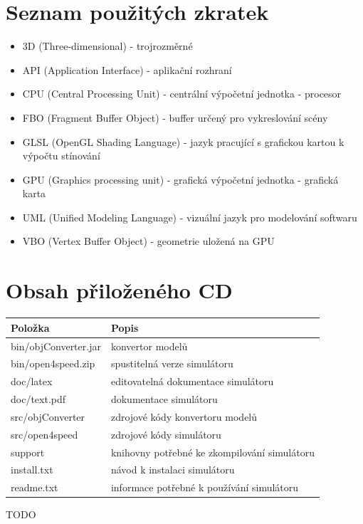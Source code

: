 \documentclass[11pt,twoside,a4paper]{book}
\begin{document}
%

\appendix

\chapter{Seznam použitých zkratek}
\begin{itemize}
\item 3D (Three-dimensional) - trojrozměrné
\item API (Application Interface) - aplikační rozhraní
\item CPU (Central Processing Unit) - centrální výpočetní jednotka - procesor
\item FBO (Fragment Buffer Object) - buffer určený pro vykreslování scény
\item GLSL (OpenGL Shading Language) - jazyk pracující s grafickou kartou k výpočtu stínování
\item GPU (Graphics processing unit) - grafická výpočetní jednotka - grafická karta
\item UML (Unified Modeling Language) - vizuální jazyk pro modelování softwaru
\item VBO (Vertex Buffer Object) - geometrie uložená na GPU
\end{itemize}

\chapter{Obsah přiloženého CD}

\begin{center}
\begin{tabular}{|p{50mm}|p{100mm}|}
\hline
\textbf{Položka} & 
\textbf{Popis} \\
\hline
\hline
bin/objConverter.jar & konvertor modelů\\
\hline
bin/open4speed.zip & spustitelná verze simulátoru\\
\hline
doc/latex & editovatelná dokumentace simulátoru\\
\hline
doc/text.pdf & dokumentace simulátoru\\
\hline
src/objConverter & zdrojové kódy konvertoru modelů\\
\hline
src/open4speed & zdrojové kódy simulátoru\\
\hline
support & knihovny potřebné ke zkompilování simulátoru\\
\hline
install.txt & návod k instalaci simulátoru\\
\hline
readme.txt & informace potřebné k používání simulátoru\\
\hline
\end{tabular}
\end{center}
TODO
\end{document}
